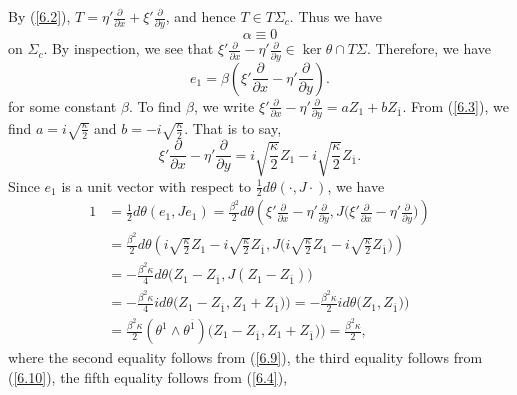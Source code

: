 \documentclass{amsart}
\theoremstyle{Corollary}
\numberwithin{equation}{section}
\begin{document}
By (\ref{6.2}), 
$T=\displaystyle\eta'\frac{\partial}{\partial x}+\xi'\frac{\partial}{\partial y}$, 
and hence $T\in T\Sigma_c$. 
Thus we have 
\begin{equation}\label{6.8}
\alpha\equiv 0
\end{equation}
on $\Sigma_c$. 
By inspection, we see that 
$\displaystyle\xi'\frac{\partial}{\partial x}-\eta'\frac{\partial}{\partial y}\in \ker\theta\cap T\Sigma$. 
Therefore, we have 
\begin{equation}\label{6.9}
e_1=\beta\left(\xi'\frac{\partial}{\partial x}-\eta'\frac{\partial}{\partial y}\right).
\end{equation}
for some constant $\beta$. 
To find $\beta$, we write 
$\displaystyle
\xi'\frac{\partial}{\partial x}-\eta'\frac{\partial}{\partial y}=aZ_1+bZ_{\overline{1}}. 
$
From (\ref{6.3}), we find
$a=\displaystyle i\sqrt{\frac{\kappa}{2}}$ and $b=\displaystyle-i\sqrt{\frac{\kappa}{2}}$. That is to say, 
\begin{equation}\label{6.10}
\xi'\frac{\partial}{\partial x}-\eta'\frac{\partial}{\partial y}=i\sqrt{\frac{\kappa}{2}}Z_1-i\sqrt{\frac{\kappa}{2}}Z_{\overline{1}}. 
\end{equation}
Since $e_1$ is a unit vector 
with respect to  $\frac{1}{2}d\theta(\cdot,J\cdot)$, 
we have 
\begin{equation*}
\begin{split}
1&=\frac{1}{2}d\theta(e_1,Je_1)=\frac{\beta^2}{2}d\theta\left(\xi'\frac{\partial}{\partial x}-\eta'\frac{\partial}{\partial y}, J\Big(\xi'\frac{\partial}{\partial x}-\eta'\frac{\partial}{\partial y}\Big)\right)\\
&=\frac{\beta^2}{2}d\theta\left(i\sqrt{\frac{\kappa}{2}}Z_1-i\sqrt{\frac{\kappa}{2}}Z_{\overline{1}}, J\Big(i\sqrt{\frac{\kappa}{2}}Z_1-i\sqrt{\frac{\kappa}{2}}Z_{\overline{1}}\Big)\right)\\
&=-\frac{\beta^2\kappa}{4}d\theta\big(Z_1-Z_{\overline{1}},J(Z_1-Z_{\overline{1}})\big)\\
&=-\frac{\beta^2\kappa}{4}id\theta\big(Z_1-Z_{\overline{1}},Z_1+Z_{\overline{1}})\big)
=-\frac{\beta^2\kappa}{2}id\theta\big(Z_1,Z_{\overline{1}})\big)\\
&=\frac{\beta^2\kappa}{2}(\theta^1\wedge \theta^{\overline{1}})\big(Z_1-Z_{\overline{1}},Z_1+Z_{\overline{1}})\big)=
\frac{\beta^2\kappa}{2},
\end{split}
\end{equation*}
where the second equality follows from (\ref{6.9}), 
the third equality follows from (\ref{6.10}), 
the fifth equality follows from (\ref{6.4}), 
\end{document}
